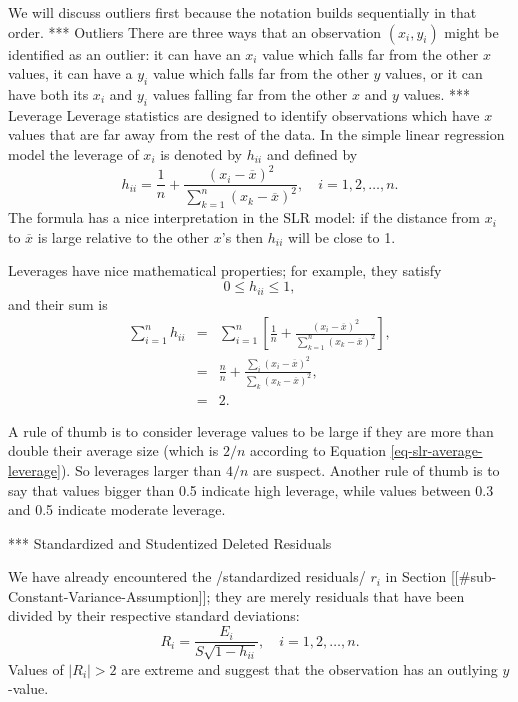 We will discuss outliers first because the notation builds
sequentially in that order.
*** Outliers
There are three ways that an observation \((x_{i},y_{i})\) might be
identified as an outlier: it can have an \(x_{i}\) value which falls
far from the other \(x\) values, it can have a \(y_{i}\) value which
falls far from the other \(y\) values, or it can have both its
\(x_{i}\) and \(y_{i}\) values falling far from the other \(x\) and
\(y\) values.
*** Leverage
Leverage statistics are designed to identify observations which have
\(x\) values that are far away from the rest of the data. In the
simple linear regression model the leverage of \(x_{i}\) is denoted by
\(h_{ii}\) and defined by
\begin{equation}
h_{ii}=\frac{1}{n}+\frac{(x_{i}-\overline{x})^{2}}{\sum_{k=1}^{n}(x_{k}-\overline{x})^{2}},\quad i=1,2,\ldots,n.
\end{equation}
The formula has a nice interpretation in the SLR model: if the
distance from \(x_{i}\) to \(\overline{x}\) is large relative to the
other \(x\)'s then \(h_{ii}\) will be close to 1.

Leverages have nice mathematical properties; for example, they satisfy
\begin{equation}
\label{eq-slr-leverage-between}
0\leq h_{ii}\leq1,
\end{equation}
and their sum is
\begin{eqnarray}
\label{eq-slr-average-leverage}
\sum_{i=1}^{n}h_{ii} & = & \sum_{i=1}^{n}\left[\frac{1}{n}+\frac{(x_{i}-\overline{x})^{2}}{\sum_{k=1}^{n}(x_{k}-\overline{x})^{2}}\right],\\
 & = & \frac{n}{n}+\frac{\sum_{i}(x_{i}-\overline{x})^{2}}{\sum_{k}(x_{k}-\overline{x})^{2}},\\
 & = & 2.
\end{eqnarray}

A rule of thumb is to consider leverage values to be large if they are
more than double their average size (which is \(2/n\) according to
Equation \eqref{eq-slr-average-leverage}). So leverages larger than \(4/n\)
are suspect. Another rule of thumb is to say that values bigger than
0.5 indicate high leverage, while values between 0.3 and 0.5 indicate
moderate leverage.

*** Standardized and Studentized Deleted Residuals

We have already encountered the /standardized residuals/ \(r_{i}\) in
Section [[#sub-Constant-Variance-Assumption]]; they are merely residuals that
have been divided by their respective standard deviations:
\begin{equation}
R_{i}=\frac{E_{i}}{S\sqrt{1-h_{ii}}},\quad i=1,2,\ldots,n.
\end{equation}
Values of \(|R_{i}| > 2\) are extreme and suggest that the observation has an outlying \(y\)-value. 

